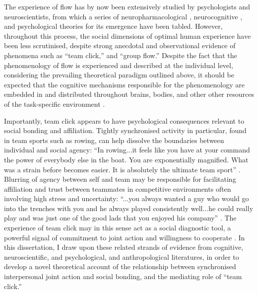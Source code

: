 The experience of flow has by now been extensively studied by psychologists and neuroscientists, from which a series of neuropharmacological \citep{Boecker2008}, neurocognitive \citep{Dietrich2006,Dietrich2011,Labelle2013}, and psychological \citep{Csikszentmihalyi1992} theories for its emergence have been tabled. However, throughout this process, the social dimensions of optimal human experience have been less scrutinised, despite strong anecdotal and observational evidence of phenomena such as ``team click,'' and ``group flow.''   Despite the fact that the phenomenology of flow is experienced and described at the individual level, considering the prevailing theoretical paradigm outlined above, it should be expected that the cognitive mechanisms responsible for the phenomenology are embedded in and distributed throughout brains, bodies, and other other resources of the task-specific environment \citep{Kirsh2006,Marsh2009,Noy2015}.

Importantly, team click appears to have psychological consequences relevant to social bonding and affiliation. Tightly synchronised activity in particular, found in team sports such as rowing, can help dissolve the boundaries between individual and social agency: ``In rowing...it feels like you have at your command the power of everybody else in the boat. You are exponentially magnified. What was a strain before becomes easier. It is absolutely the ultimate team sport'' \citep{Brown2016}.
Blurring of agency between self and team may be responsible for facilitating affiliation and trust between teammates in competitive environments often involving high stress and uncertainty: ``...you always wanted a guy who would go into the trenches with you and he always played consistently well...he could really play and was just one of the good lads that you enjoyed his company'' \citep{Fox-Sports2017}. The experience of team click may in this sense act as a social diagnostic tool, a powerful signal of commitment to joint action and willingness to cooperate \citep{Reddish2013a}.  In this dissertation, I draw upon these related strands of evidence from cognitive, neuroscientific, and psychological, and anthropological literatures, in order to develop a novel theoretical account of the relationship between synchronised interpersonal joint action and social bonding, and the mediating role of ``team click.''

